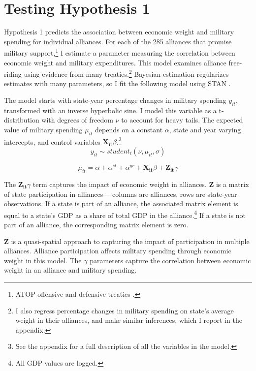 \documentclass[12pt]{article}
\begin{document}
\section{Testing Hypothesis 1}


Hypothesis 1 predicts the association between economic weight and military spending for individual alliances. 
For each of the 285 alliances that promise military support,\footnote{ATOP offensive and defensive treaties \citep{Leedsetal2002}.} I estimate a parameter measuring the correlation between economic weight and military expenditures. 
This model examines alliance free-riding using evidence from many treaties.\footnote{I also regress percentage changes in military spending on state's average weight in their alliances, and make similar inferences, which I report in the appendix.}
Bayesian estimation regularizes estimates with many parameters, so I fit the following model using STAN \citep{Carpenteretal2016}.


The model starts with state-year percentage changes in military spending $y_{it}$, transformed with an inverse hyperbolic sine.
I model this variable as a t-distribution with degrees of freedom $\nu$ to account for heavy tails.
The expected value of military spending $\mu_{it}$ depends on a constant $\alpha$, state and year varying intercepts, and control variables $\mathbf{X_{it}} \beta$.\footnote{See the appendix for a full description of all the variables in the model.} 
\begin{equation}
y_{it} \sim student_t(\nu, \mu_{it}, \sigma) 
\end{equation}

\begin{equation}
\mu_{it} = \alpha + \alpha^{st} + \alpha^{yr} + \mathbf{X_{it}} \beta + \mathbf{Z_{it}} \gamma
\end{equation}


The $\mathbf{Z_{it}} \gamma$ term captures the impact of economic weight in alliances.  
\textbf{Z} is a matrix of state participation in alliances--- columns are alliances, rows are state-year observations.  
If a state is part of an alliance, the associated matrix element is equal to a state's GDP as a share of total GDP in the alliance.\footnote{All GDP values are logged.} 
If a state is not part of an alliance, the corresponding matrix element is zero. 


\textbf{Z} is a quasi-spatial approach to capturing the impact of participation in multiple alliances.
Alliance participation affects military spending through economic weight in this model.  
The $\gamma$ parameters capture the correlation between economic weight in an alliance and military spending. 
\end{document}
